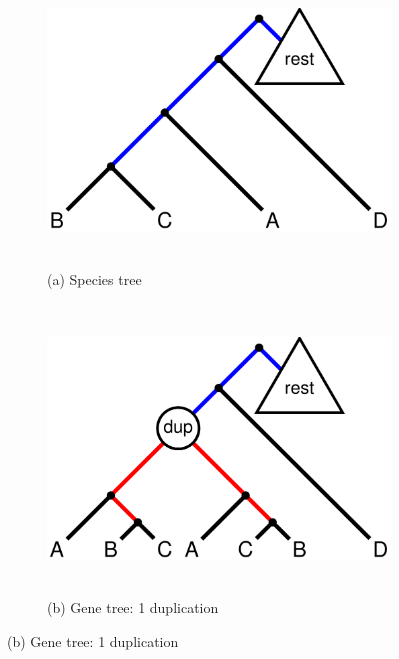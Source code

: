 \begin{figure}[!h]
	\centering
	\begin{subfigure}[t]{0.4\textwidth}
	\centering
		\includegraphics[width=\textwidth]{figures/fastmulrfs-fig2a.pdf}
		~
		\caption{(a) Species tree} 
	\end{subfigure}
	~~~~~~~~~~
	\begin{subfigure}[t]{0.4\textwidth}
	\centering
		\includegraphics[width=\textwidth]{figures/fastmulrfs-fig2b.pdf}
		~
		\caption{(b) Gene tree: 1 duplication} 
	\end{subfigure}

	\vspace{24pt}


\end{figure}
